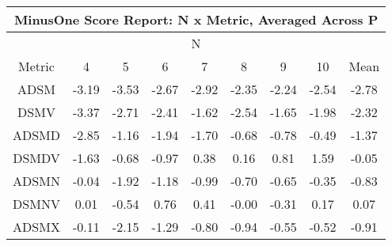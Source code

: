 \documentclass[11pt,a4paper]{report}
\begin{document}
\begin{centering}
\begin{longtable}{ | c || c | c | c | c | c | c | c || c |}
\hline
\multicolumn{9}{|c|}{ MinusOne Score Report: N x Metric, Averaged Across P } \\
\hline
\multicolumn{9}{|c|}{ N } \\
\hline
Metric & 4 & 5 & 6 & 7 & 8 & 9 & 10 & Mean\\
\hline
\hline
\endhead
ADSM &  \cellcolor[HTML]{FFAFAF} -3.19 &  \cellcolor[HTML]{FFA7A7} -3.53 &  \cellcolor[HTML]{FFBFBF} -2.67 &  \cellcolor[HTML]{FFB7B7} -2.92 &  \cellcolor[HTML]{FFC7C7} -2.35 &  \cellcolor[HTML]{FFC7C7} -2.24 &  \cellcolor[HTML]{FFBFBF} -2.54 &  \cellcolor[HTML]{FFB7B7} -2.78 \\
DSMV &  \cellcolor[HTML]{FFA7A7} -3.37 &  \cellcolor[HTML]{FFB7B7} -2.71 &  \cellcolor[HTML]{FFBFBF} -2.41 &  \cellcolor[HTML]{FFD7D7} -1.62 &  \cellcolor[HTML]{FFBFBF} -2.54 &  \cellcolor[HTML]{FFD7D7} -1.65 &  \cellcolor[HTML]{FFCFCF} -1.98 &  \cellcolor[HTML]{FFC7C7} -2.32 \\
ADSMD &  \cellcolor[HTML]{FFB7B7} -2.85 &  \cellcolor[HTML]{FFDFDF} -1.16 &  \cellcolor[HTML]{FFCFCF} -1.94 &  \cellcolor[HTML]{FFD7D7} -1.70 &  \cellcolor[HTML]{FFEFEF} -0.68 &  \cellcolor[HTML]{FFEFEF} -0.78 &  \cellcolor[HTML]{FFEFEF} -0.49 &  \cellcolor[HTML]{FFDFDF} -1.37 \\
DSMDV &  \cellcolor[HTML]{FFD7D7} -1.63 &  \cellcolor[HTML]{FFEFEF} -0.68 &  \cellcolor[HTML]{FFE7E7} -0.97 &  \cellcolor[HTML]{F7F7FF} 0.38 &  \cellcolor[HTML]{F7F7FF} 0.16 &  \cellcolor[HTML]{E7E7FF} 0.81 &  \cellcolor[HTML]{D7D7FF} 1.59 &  \cellcolor[HTML]{FFFFFF} -0.05 \\
ADSMN &  \cellcolor[HTML]{FFFFFF} -0.04 &  \cellcolor[HTML]{FFCFCF} -1.92 &  \cellcolor[HTML]{FFDFDF} -1.18 &  \cellcolor[HTML]{FFE7E7} -0.99 &  \cellcolor[HTML]{FFEFEF} -0.70 &  \cellcolor[HTML]{FFEFEF} -0.65 &  \cellcolor[HTML]{FFF7F7} -0.35 &  \cellcolor[HTML]{FFE7E7} -0.83 \\
DSMNV &  \cellcolor[HTML]{FFFFFF} 0.01 &  \cellcolor[HTML]{FFEFEF} -0.54 &  \cellcolor[HTML]{EFEFFF} 0.76 &  \cellcolor[HTML]{F7F7FF} 0.41 &  \cellcolor[HTML]{FFFFFF} -0.00 &  \cellcolor[HTML]{FFF7F7} -0.31 &  \cellcolor[HTML]{F7F7FF} 0.17 &  \cellcolor[HTML]{FFFFFF} 0.07 \\
ADSMX &  \cellcolor[HTML]{FFFFFF} -0.11 &  \cellcolor[HTML]{FFC7C7} -2.15 &  \cellcolor[HTML]{FFDFDF} -1.29 &  \cellcolor[HTML]{FFE7E7} -0.80 &  \cellcolor[HTML]{FFE7E7} -0.94 &  \cellcolor[HTML]{FFEFEF} -0.55 &  \cellcolor[HTML]{FFEFEF} -0.52 &  \cellcolor[HTML]{FFE7E7} -0.91 \\

\end{longtable}
\end{centering}
\end{document}
